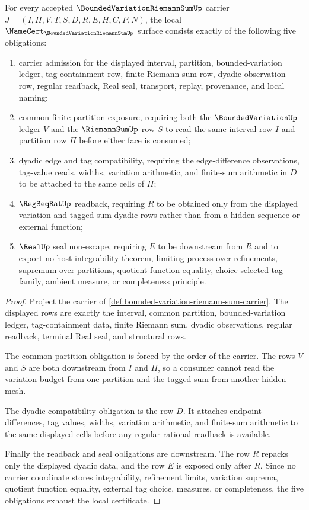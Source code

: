 \begin{theorem}
\label{thm:bounded-variation-riemann-sum-obligations}
For every accepted $\BoundedVariationRiemannSumUp$ carrier $J=(I,\Pi,V,T,S,D,R,E,H,C,P,N)$, the local $\NameCert_{\BoundedVariationRiemannSumUp}$ surface consists exactly of the following five obligations:
\begin{enumerate}
\item carrier admission for the displayed interval, partition, bounded-variation ledger, tag-containment row, finite Riemann-sum row, dyadic observation row, regular readback, Real seal, transport, replay, provenance, and local naming;
\item common finite-partition exposure, requiring both the $\BoundedVariationUp$ ledger $V$ and the $\RiemannSumUp$ row $S$ to read the same interval row $I$ and partition row $\Pi$ before either face is consumed;
\item dyadic edge and tag compatibility, requiring the edge-difference observations, tag-value reads, widths, variation arithmetic, and finite-sum arithmetic in $D$ to be attached to the same cells of $\Pi$;
\item $\RegSeqRatUp$ readback, requiring $R$ to be obtained only from the displayed variation and tagged-sum dyadic rows rather than from a hidden sequence or external function;
\item $\RealUp$ seal non-escape, requiring $E$ to be downstream from $R$ and to export no host integrability theorem, limiting process over refinements, supremum over partitions, quotient function equality, choice-selected tag family, ambient measure, or completeness principle.
\end{enumerate}
\end{theorem}
\begin{proof}
Project the carrier of \autoref{def:bounded-variation-riemann-sum-carrier}. The displayed rows are exactly the interval, common partition, bounded-variation ledger, tag-containment data, finite Riemann sum, dyadic observations, regular readback, terminal Real seal, and structural rows.

The common-partition obligation is forced by the order of the carrier. The rows $V$ and $S$ are both downstream from $I$ and $\Pi$, so a consumer cannot read the variation budget from one partition and the tagged sum from another hidden mesh.

The dyadic compatibility obligation is the row $D$. It attaches endpoint differences, tag values, widths, variation arithmetic, and finite-sum arithmetic to the same displayed cells before any regular rational readback is available.

Finally the readback and seal obligations are downstream. The row $R$ repacks only the displayed dyadic data, and the row $E$ is exposed only after $R$. Since no carrier coordinate stores integrability, refinement limits, variation suprema, quotient function equality, external tag choice, measures, or completeness, the five obligations exhaust the local certificate.
\end{proof}


